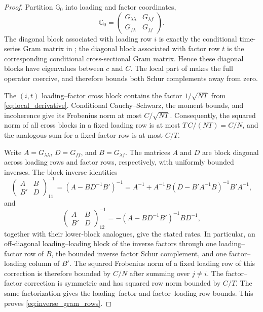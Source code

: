 \documentclass[11pt]{article}
\numberwithin{equation}{section}
\theoremstyle{remark}
\begin{document}
\begin{proof}
Partition $\mathbb G_0$ into loading and factor coordinates,
$$
\mathbb G_0
=
\begin{pmatrix}
G_{\lambda\lambda}&G_{\lambda f}\\
G_{f\lambda}&G_{ff}
\end{pmatrix}.
$$
The diagonal block associated with loading row $i$ is exactly the conditional time-series Gram matrix in ; the diagonal block associated with factor row $t$ is the corresponding conditional cross-sectional Gram matrix. Hence these diagonal blocks have eigenvalues between $c$ and $C$. The local part of  makes the full operator coercive, and therefore bounds both Schur complements away from zero.

The $(i,t)$ loading--factor cross block contains the factor $1/\sqrt{NT}$ from \eqref{eq:local_derivative}. Conditional Cauchy--Schwarz, the moment bounds, and incoherence give its Frobenius norm at most $C/\sqrt{NT}$. Consequently, the squared norm of all cross blocks in a fixed loading row is at most $T\,C/(NT)=C/N$, and the analogous sum for a fixed factor row is at most $C/T$.

Write $A=G_{\lambda\lambda}$, $D=G_{ff}$, and $B=G_{\lambda f}$. The matrices $A$ and $D$ are block diagonal across loading rows and factor rows, respectively, with uniformly bounded inverses. The block inverse identities
$$
\begin{pmatrix}A&B\\B'&D\end{pmatrix}^{-1}_{11}
=(A-BD^{-1}B')^{-1}
=
A^{-1}
+
A^{-1}B(D-B'A^{-1}B)^{-1}B'A^{-1},
$$
and
$$
\begin{pmatrix}A&B\\B'&D\end{pmatrix}^{-1}_{12}
=-(A-BD^{-1}B')^{-1}BD^{-1},
$$
together with their lower-block analogues, give the stated rates. In particular, an off-diagonal loading--loading block of the inverse factors through one loading--factor row of $B$, the bounded inverse factor Schur complement, and one factor--loading column of $B'$. The squared Frobenius norm of a fixed loading row of this correction is therefore bounded by $C/N$ after summing over $j\ne i$. The factor--factor correction is symmetric and has squared row norm bounded by $C/T$. The same factorization gives the loading--factor and factor--loading row bounds. This proves \eqref{eq:inverse_gram_rows}.
\end{proof}
\end{document}
